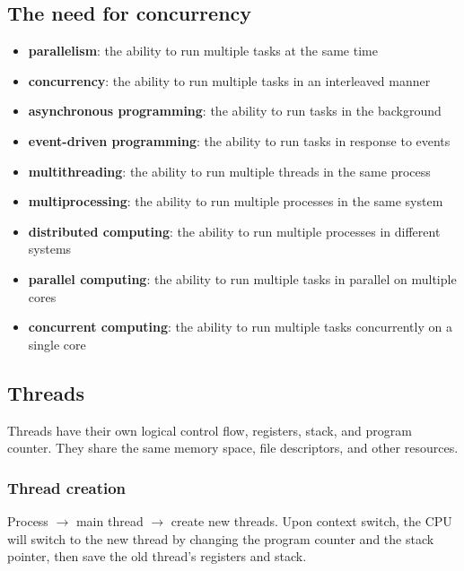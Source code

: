 \documentclass[letterpaper,12pt]{article}
\begin{document}
\subsection{The need for concurrency}
\begin{itemize}
    \item \textbf{parallelism}: the ability to run multiple tasks at the same time
    \item \textbf{concurrency}: the ability to run multiple tasks in an interleaved manner
    \item \textbf{asynchronous programming}: the ability to run tasks in the background
    \item \textbf{event-driven programming}: the ability to run tasks in response to events
    \item \textbf{multithreading}: the ability to run multiple threads in the same process
    \item \textbf{multiprocessing}: the ability to run multiple processes in the same system
    \item \textbf{distributed computing}: the ability to run multiple processes in different systems
    \item \textbf{parallel computing}: the ability to run multiple tasks in parallel on multiple cores
    \item \textbf{concurrent computing}: the ability to run multiple tasks concurrently on a single core
\end{itemize}
\subsection{Threads}
Threads have their own logical control flow, registers, stack, and program counter. They share the same memory space, file descriptors, and other resources.
\subsubsection{Thread creation}
Process $\to$ main thread $\to$ create new threads. Upon context switch, the CPU will switch to the new thread by changing the program counter and the stack pointer, then save the old thread's registers and stack.
\end{document}

